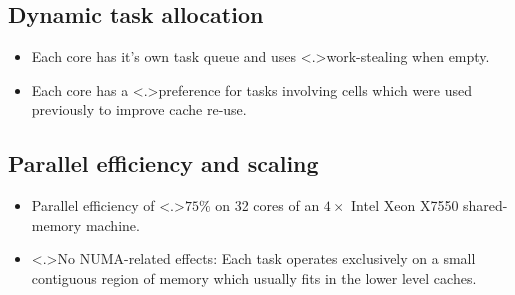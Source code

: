 \documentclass{beamer}
\begin{document}
    
    \subsection{Dynamic task allocation}
    
    \begin{frame}
    
        \centerline{}
        
        \pause
        
        \begin{itemize}
        
            \item<+-> Each core has it's own task queue and uses
                \alert<.>{work-stealing} when empty.
                
            \item<+-> Each core has a \alert<.>{preference} for tasks involving
                cells which were used previously to improve cache re-use.

        \end{itemize}
    \end{frame}
    
    
    \subsection{Parallel efficiency and scaling}
    
    \begin{frame}
    
        \pause
        
        \centerline{}
        
        \pause
        
        \begin{itemize}
        
            \item<+-> Parallel efficiency of \alert<.>{$75\%$} on 32 cores of
                an $4\times$ Intel Xeon X7550 shared-memory machine.
                
            \item<+-> \alert<.>{No NUMA-related effects}: Each
                task operates exclusively on a small contiguous region
                of memory which usually
                fits in the \alert<+>{lower level caches}.

        \end{itemize}
    \end{frame}
    
\end{document}

